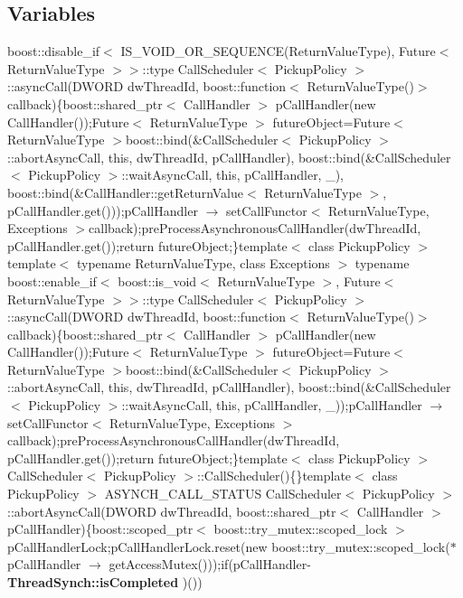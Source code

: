 \subsection*{Variables}
\begin{CompactItemize}
\item 
boost::disable\_\-if$<$ IS\_\-VOID\_\-OR\_\-SEQUENCE(Return\-Value\-Type), Future$<$ Return\-Value\-Type $>$$>$::type Call\-Scheduler$<$ Pickup\-Policy $>$::async\-Call(DWORD dw\-Thread\-Id, boost::function$<$ Return\-Value\-Type()$>$ callback)\{boost::shared\_\-ptr$<$ Call\-Handler $>$ p\-Call\-Handler(new Call\-Handler());Future$<$ Return\-Value\-Type $>$ future\-Object=Future$<$ Return\-Value\-Type $>$boost::bind(\&Call\-Scheduler$<$ Pickup\-Policy $>$::abort\-Async\-Call, this, dw\-Thread\-Id, p\-Call\-Handler), boost::bind(\&Call\-Scheduler$<$ Pickup\-Policy $>$::wait\-Async\-Call, this, p\-Call\-Handler, \_), boost::bind(\&Call\-Handler::get\-Return\-Value$<$ Return\-Value\-Type $>$, p\-Call\-Handler.get()));p\-Call\-Handler $\rightarrow$ set\-Call\-Functor$<$ Return\-Value\-Type, Exceptions $>$callback);pre\-Process\-Asynchronous\-Call\-Handler(dw\-Thread\-Id, p\-Call\-Handler.get());return future\-Object;\}template$<$ class Pickup\-Policy $>$ template$<$ typename Return\-Value\-Type, class Exceptions $>$ typename boost::enable\_\-if$<$ boost::is\_\-void$<$ Return\-Value\-Type $>$, Future$<$ Return\-Value\-Type $>$$>$::type Call\-Scheduler$<$ Pickup\-Policy $>$::async\-Call(DWORD dw\-Thread\-Id, boost::function$<$ Return\-Value\-Type()$>$ callback)\{boost::shared\_\-ptr$<$ Call\-Handler $>$ p\-Call\-Handler(new Call\-Handler());Future$<$ Return\-Value\-Type $>$ future\-Object=Future$<$ Return\-Value\-Type $>$boost::bind(\&Call\-Scheduler$<$ Pickup\-Policy $>$::abort\-Async\-Call, this, dw\-Thread\-Id, p\-Call\-Handler), boost::bind(\&Call\-Scheduler$<$ Pickup\-Policy $>$::wait\-Async\-Call, this, p\-Call\-Handler, \_));p\-Call\-Handler $\rightarrow$ set\-Call\-Functor$<$ Return\-Value\-Type, Exceptions $>$callback);pre\-Process\-Asynchronous\-Call\-Handler(dw\-Thread\-Id, p\-Call\-Handler.get());return future\-Object;\}template$<$ class Pickup\-Policy $>$ Call\-Scheduler$<$ Pickup\-Policy $>$::Call\-Scheduler()\{\}template$<$ class Pickup\-Policy $>$ ASYNCH\_\-CALL\_\-STATUS Call\-Scheduler$<$ Pickup\-Policy $>$::abort\-Async\-Call(DWORD dw\-Thread\-Id, boost::shared\_\-ptr$<$ Call\-Handler $>$ p\-Call\-Handler)\{boost::scoped\_\-ptr$<$ boost::try\_\-mutex::scoped\_\-lock $>$ p\-Call\-Handler\-Lock;p\-Call\-Handler\-Lock.reset(new boost::try\_\-mutex::scoped\_\-lock($\ast$p\-Call\-Handler $\rightarrow$ get\-Access\-Mutex()));if(p\-Call\-Handler- {\bf Thread\-Synch::is\-Completed} )())
\end{CompactItemize}


